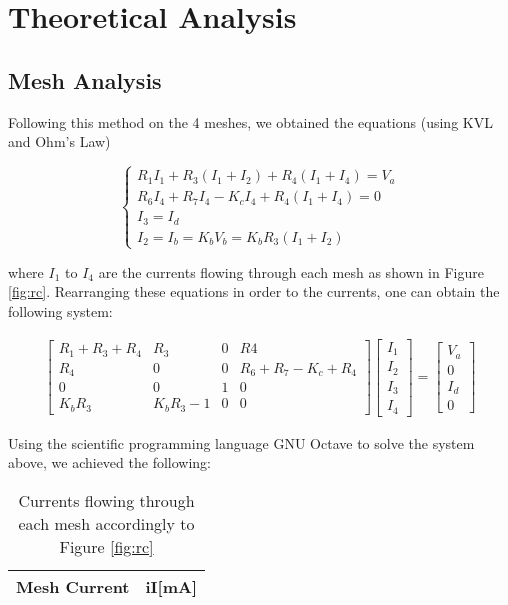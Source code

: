 \section{Theoretical Analysis}
\label{sec:analysis}

\subsection{Mesh Analysis}

Following this method on the 4 meshes, we obtained the equations (using KVL and Ohm's Law)

\begin{equation}
\begin{cases}
R_1 I_1 + R_3 (I_1+I_2)+R_4(I_1+I_4)=V_a\\
R_6 I_4 + R_7 I_4 -K_c I_4 + R_4 (I_1+I_4)=0\\
I_3=I_d\\
I_2=I_b=K_b V_b = K_b R_3 (I_1+I_2)
\end{cases}
\end{equation}

where $I_1$ to $I_4$ are the currents flowing through each mesh as shown in Figure \ref{fig:rc}. Rearranging these equations in order to the currents, one can obtain the following system:

\begin{gather}
    \begin{bmatrix}
     R_1+R_3+R_4 & R_3 & 0 & R4 \\
     R_4 & 0 & 0 & R_6+R_7-K_c+R_4\\
     0 & 0 & 1 & 0 \\
     K_b R_3 & K_b R_3 -1 & 0 & 0 
    \end{bmatrix}
    \begin{bmatrix}
     I_1\\
     I_2\\
     I_3\\
     I_4
    \end{bmatrix}
    =
    \begin{bmatrix}
     V_a\\
     0\\
     I_d\\
     0
    \end{bmatrix}
\end{gather}

Using the scientific programming language GNU Octave to solve the system above, we achieved the following:

\begin{table}[h]
  \centering
  \begin{tabular}{|l|r|}
    \hline    
    {\bf Mesh Current} & {\bf iI[mA]} \\ \hline
    
 \end{tabular}
 \caption{Currents flowing through each mesh accordingly to Figure \ref{fig:rc}}
  \label{tab:op}
\end{table}

